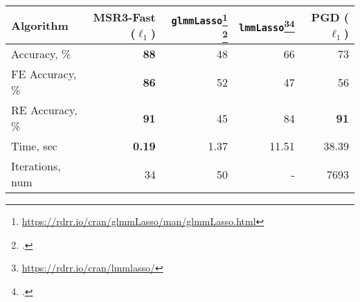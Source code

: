 \begin{tabular}{lrrrr}
\toprule
Algorithm &        MSR3-Fast ($\ell_1$)&         \texttt{glmmLasso}\footnote{\href{https://rdrr.io/cran/glmmLasso/man/glmmLasso.html}{https://rdrr.io/cran/glmmLasso/man/glmmLasso.html}} \footcite{groll2014variable}  &            \texttt{lmmLasso}\footnote{\href{https://rdrr.io/cran/lmmlasso/}{https://rdrr.io/cran/lmmlasso/}}\footcite{schelldorfer2011estimation} & PGD ($\ell_1$) \\
\midrule
Accuracy, \% &     {\bf 88} &        48 &          66 & 73  \\
FE Accuracy, \% &      {\bf 86} &        52  &          47 & 56\\
RE Accuracy, \% &     {\bf 91} &        45  &         84 & {\bf 91} \\
Time, sec        & {\bf 0.19} &  1.37  &  11.51 & 38.39 \\
Iterations, num  &      34 &        50 &             - & 7693 \\
\bottomrule
\end{tabular}